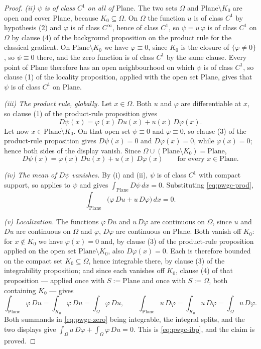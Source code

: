 \begin{proof}
\emph{(ii) $\psi$ is of class $C^{1}$ on all of $\mathrm{Plane}$.}  The two sets $\Omega$ and
$\mathrm{Plane}\setminus K_0$ are open and cover $\mathrm{Plane}$, because $K_0\subseteq\Omega$.
On $\Omega$ the function $u$ is of class $C^{1}$ by hypothesis (2) and $\varphi$ is of class
$C^\infty$, hence of class $C^{1}$, so $\psi=u\,\varphi$ is of class $C^{1}$ on $\Omega$ by
clause (4) of the background proposition on the product rule for the classical gradient.  On
$\mathrm{Plane}\setminus K_0$ we have $\varphi\equiv0$, since $K_0$ is the closure of
$\{\varphi\neq0\}$, so $\psi\equiv0$ there, and the zero function is of class $C^{1}$ by the
same clause.  Every point of $\mathrm{Plane}$ therefore has an open neighbourhood on which
$\psi$ is of class $C^{1}$, so clause (1) of the locality proposition, applied with the open set
$\mathrm{Plane}$, gives that $\psi$ is of class $C^{1}$ on $\mathrm{Plane}$.

\emph{(iii) The product rule, globally.}  Let $x\in\Omega$.  Both $u$ and $\varphi$ are
differentiable at $x$, so clause (1) of the product-rule proposition gives
\[
  D\psi(x)=\varphi(x)\,Du(x)+u(x)\,D\varphi(x).
\]
Let now $x\in\mathrm{Plane}\setminus K_0$.  On that open set $\psi\equiv0$ and $\varphi\equiv0$,
so clause (3) of the product-rule proposition gives $D\psi(x)=0$ and $D\varphi(x)=0$, while
$\varphi(x)=0$; hence both sides of the display vanish.  Since
$\Omega\cup(\mathrm{Plane}\setminus K_0)=\mathrm{Plane}$,
\begin{equation}\label{eq:pwgc-prod}
  D\psi(x)=\varphi(x)\,Du(x)+u(x)\,D\varphi(x)\qquad\text{for every }x\in\mathrm{Plane}.
\end{equation}

\emph{(iv) The mean of $D\psi$ vanishes.}  By (i) and (ii), $\psi$ is of class $C^{1}$ with
compact support, so  applies to $\psi$ and gives
$\int_{\mathrm{Plane}}D\psi\,dx=0$.  Substituting \eqref{eq:pwgc-prod},
\begin{equation}\label{eq:pwgc-zero}
  \int_{\mathrm{Plane}}\bigl(\varphi\,Du+u\,D\varphi\bigr)\,dx=0 .
\end{equation}

\emph{(v) Localization.}  The functions $\varphi\,Du$ and $u\,D\varphi$ are continuous on
$\Omega$, since $u$ and $Du$ are continuous on $\Omega$ and $\varphi$, $D\varphi$ are continuous
on $\mathrm{Plane}$.  Both vanish off $K_0$: for $x\notin K_0$ we have $\varphi(x)=0$ and, by
clause (3) of the product-rule proposition applied on the open set
$\mathrm{Plane}\setminus K_0$, also $D\varphi(x)=0$.  Each is therefore bounded on the compact
set $K_0\subseteq\Omega$, hence integrable there, by clause (3) of the integrability
proposition; and since each vanishes off $K_0$, clause (4) of that proposition --- applied once
with $S:=\mathrm{Plane}$ and once with $S:=\Omega$, both containing $K_0$ --- gives
\[
  \int_{\mathrm{Plane}}\varphi\,Du=\int_{K_0}\varphi\,Du=\int_\Omega\varphi\,Du,
  \qquad
  \int_{\mathrm{Plane}}u\,D\varphi=\int_{K_0}u\,D\varphi=\int_\Omega u\,D\varphi .
\]
Both summands in \eqref{eq:pwgc-zero} being integrable, the integral splits, and the two
displays give $\int_\Omega u\,D\varphi+\int_\Omega\varphi\,Du=0$.  This is
\eqref{eq:pwgc-ibp}, and the claim is proved.


\end{proof}
